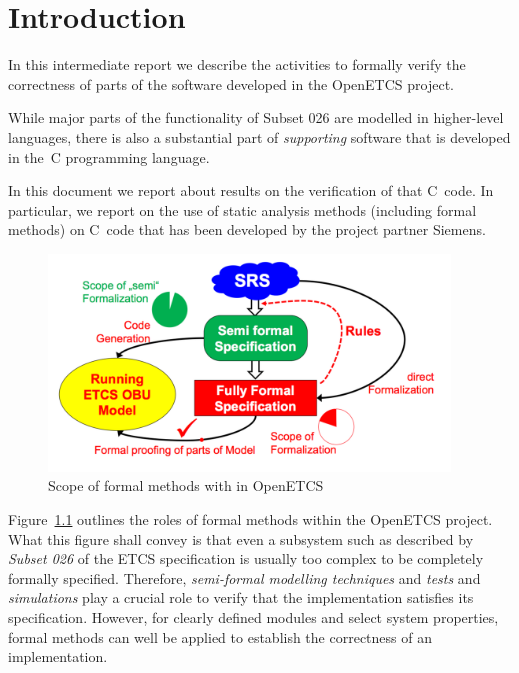 
\chapter{Introduction}

In this intermediate report we describe the activities to formally verify
the correctness of parts of the software developed in the OpenETCS project.

While major parts of the functionality of {Subset 026} are modelled in 
higher-level languages, there is also a substantial part of \emph{supporting} software
that is developed in the~C programming language.

In this document we report about results on the verification of that C~code.
In particular, we report on the use of static analysis methods (including formal methods)
on C~code that has been developed by the project partner Siemens.

\begin{figure}[hbt]
\begin{center}
\includegraphics[width=0.95\textwidth]{figures/scope-of-formalization.pdf}
\caption{\label{fig:scope-of-formalization} Scope of formal methods with in OpenETCS}
\end{center}
\end{figure}

Figure~\ref{fig:scope-of-formalization} outlines the roles of formal methods
within the OpenETCS project.
What this figure shall convey is that even a subsystem such as described by
\emph{Subset 026} of the ETCS specification
is usually too complex to be completely formally specified.
Therefore, \emph{semi-formal modelling techniques} and \emph{tests} and 
\emph{simulations} play a crucial role to verify that the implementation
satisfies its specification.
However, for clearly defined modules and select system properties, formal methods
can well be applied to establish the correctness of an implementation.

